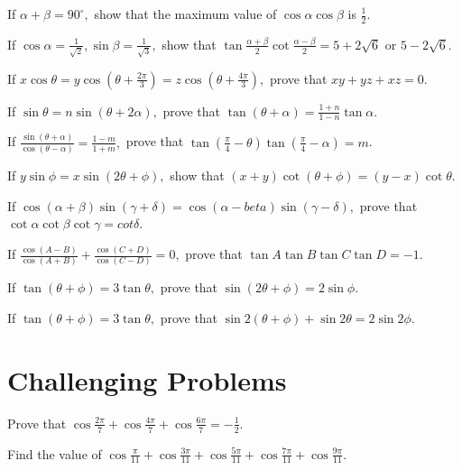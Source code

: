 \item If $\alpha + \beta = 90^\circ,$ show that the maximum value of $\cos\alpha\cos\beta$ is $\frac{1}{2}$.

\item If $\cos\alpha = \frac{1}{\sqrt{2}}, \sin\beta = \frac{1}{\sqrt{3}},$ show that $\tan\frac{\alpha +
    \beta}{2}\cot\frac{\alpha - \beta}{2} = 5 + 2\sqrt{6}$ or $5- 2\sqrt{6 }$.

\item If $x\cos\theta = y\cos\left(\theta + \frac{2\pi}{3}\right) = z\cos\left(\theta + \frac{4\pi}{3}\right),$ prove that
    $xy + yz + xz = 0$.

\item If $\sin\theta = n\sin(\theta + 2\alpha),$ prove that $\tan(\theta + \alpha) = \frac{1 + n}{1 - n}\tan\alpha$.

\item If $\frac{\sin(\theta + \alpha)}{\cos(\theta - \alpha)} = \frac{1 - m}{1 + m},$ prove that $\tan\left(\frac{\pi}{4}
    - \theta\right)\tan\left(\frac{\pi}{4} - \alpha\right) = m$.

\item If $y\sin\phi = x\sin(2\theta + \phi),$ show that $(x + y)\cot(\theta + \phi) = (y - x)\cot\theta$.

\item If $\cos(\alpha + \beta)\sin(\gamma + \delta) = \cos(\alpha - beta)\sin(\gamma - \delta),$ prove that
    $\cot\alpha\cot\beta\cot\gamma = cot\delta$.

\item If $\frac{\cos(A - B)}{\cos(A + B)} + \frac{\cos(C + D)}{\cos(C - D)} = 0,$ prove that $\tan A\tan B\tan C\tan D =
    -1$.

\item If $\tan(\theta + \phi) = 3\tan\theta,$ prove that $\sin(2\theta + \phi) = 2\sin\phi$.

\item If $\tan(\theta + \phi) = 3\tan\theta,$ prove that $\sin2(\theta + \phi) + \sin2\theta = 2\sin2\phi$.
\stopitemize

\section{Challenging Problems}
\startitemize[n, 1*broad]
\item Prove that $\cos\frac{2\pi}{7} + \cos\frac{4\pi}{7} + \cos\frac{6\pi}{7} = -\frac{1}{2}$.

\item Find the value of $\cos\frac{\pi}{11} + \cos\frac{3\pi}{11} + \cos\frac{5\pi}{11} + \cos\frac{7\pi}{11} +
    \cos\frac{9\pi}{11}$.

